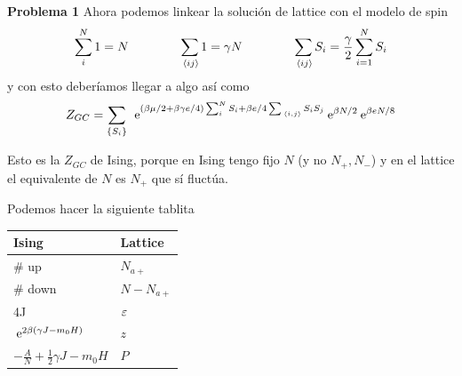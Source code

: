 \documentclass[10pt,oneside]{CBFT_book}
\begin{document}
\begin{ejemplo}{\bf Problema 1}
Ahora podemos linkear la solución de lattice con el modelo de spin
\[
	\sum_i^N 1 = N  \qquad \qquad 
	\sum_{\:\left\langle ij \right\rangle} 1 = \gamma N \qquad \qquad 
	\sum_{\:\left\langle ij \right\rangle} S_i = \frac{\gamma}{2} \sum_{i=1}^N S_i
\]
y con esto deberíamos llegar a algo así como
\[
	Z_{GC} = \sum_{\{ S_i \} } \: \:\mathrm{e}^{ (\beta \mu / 2 + \beta \gamma e / 4 ) 
	\sum_i^N S_i + \beta e/ 4 \sum_{\:\left\langle i,j \right\rangle} S_i S_j}
	\:\mathrm{e}^{\beta N/2} \:\mathrm{e}^{\beta e N/8} 
\]

Esto es la $Z_{GC}$ de Ising, porque en Ising tengo fijo $N$ (y no $N_+,N_-$) y en el lattice
el equivalente de $N$ es $N_+$ que sí fluctúa.

Podemos hacer la siguiente tablita 
\begin{center}
\begin{tabular}{l|l}
Ising & Lattice \\
\hline 
\# up & $N_{a+}$ \\
\# down & $N - N_{a+}$ \\
4J & $\varepsilon $\\
$\:\mathrm{e}^{2 \beta (\gamma J - m_0 H ) }$ & $z$ \\
$-\frac{A}{N} + \frac{1}{2} \gamma J - m_0 H$ &  $P $
\end{tabular}
\end{center}

 
\end{ejemplo}
\end{document}
